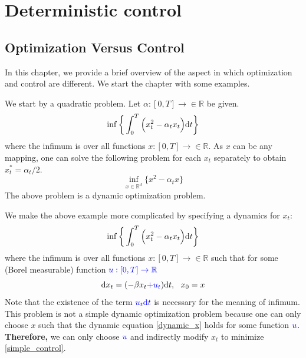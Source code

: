 \documentclass[11pt]{book}
\newcommand{\dt}{\text{\normalfont d}t}
\newcommand{\dx}{\text{\normalfont d}x}
\begin{document}
\newpage
\setcounter{secnumdepth}{2}
\setcounter{page}{1}
\chapter{Deterministic control}
\label{chap:deterministic}
\section{Optimization Versus Control}
\label{sec:opt_control}
In this chapter, we provide a brief overview of the aspect in which optimization and control are different.  We start the chapter with some examples.
\begin{eg}\label{simple_optimization}
We start by a quadratic problem. Let $\alpha:[0,T]\to\in\mathbb{R}$ be given.
    \begin{equation}
        \inf\bigg\{\int_0^T\Big(x_t^2 - \alpha_t x_t\Big) {{\dt}}\bigg\}
    \end{equation}
where the infimum is over all functions $x:[0,T]\to\in\mathbb{R}$. As $x$ can be any mapping, one can solve the following problem for each $x_t$ separately to obtain $x^*_t=\alpha_t/2$.
    \begin{equation}
        \inf_{x\in\mathbb{R}^d}\bigg\{x^2 - \alpha_t x\bigg\}
    \end{equation}
The above problem is a dynamic optimization problem. 
\end{eg}
\begin{eg}
We make the above example more complicated by specifying a dynamics for $x_t$:
    \begin{equation}\label{simple_control}
        \inf\bigg\{\int_0^T\Big(x_t^2 - \alpha_t x_t\Big) {{\dt}}\bigg\}
    \end{equation}
where the infimum is over all functions $x:[0,T]\to\in\mathbb{R}$ such that for some (Borel measurable) function ${\color{blue} u:[0,T]\to\mathbb{R}}$
\begin{equation}\label{dynamic_x}
    {\dx}_t = (-\beta x_t  {\color{blue}+ u_t }) {{\dt}}, ~~ x_0=x
\end{equation}
Note that the existence of the term ${\color{blue} u_t {{\dt}}}$ is necessary for the meaning of infimum. This problem is not a simple dynamic optimization problem because one can only choose $x$ such that the dynamic equation \eqref{dynamic_x} holds for some function ${\color{blue} u}$. \textbf{Therefore,} we can only choose ${\color{blue} u}$ and indirectly modify $x_t$ to minimize \eqref{simple_control}.
\end{eg}
\end{document}
